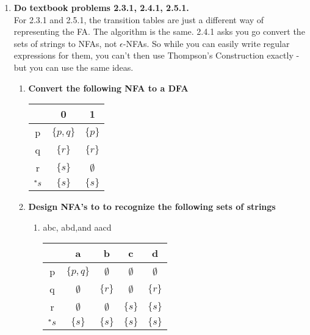 \begin{enumerate}
\newpage
\item \textbf{Do textbook problems 2.3.1, 2.4.1, 2.5.1.}
\\ For 2.3.1 and 2.5.1, the transition tables are just a different way of representing the FA. The algorithm is the same.
2.4.1 asks you go convert the sets of strings to NFAs, not $\epsilon$-NFAs. So while you can easily write regular expressions for them, you can't then use Thompson's Construction exactly -  but you can use the same ideas.
\begin{enumerate}
	\item \textbf{Convert the following NFA to a DFA}
	\begin{table}[H]
						\centering
		\begin{tabular}{c||c|c}
			 &  0 &  1   \\ \hline
			p& $\{p,q\}$ &  $\{p\}$   \\ \hline
			q&  $\{r\}$& $\{r\}$   \\ \hline
			r&  $\{s\}$& $\emptyset$   \\ \hline
			${}^\ast s$& $\{s\}$ & $\{s\}$ \\ \hline
		\end{tabular}
	\end{table}

\begin{figure}[h]
	\centering
\end{figure}

	\item \textbf{Design NFA's to to recognize the following sets of strings}
		\begin{enumerate}
			\item abc, abd,and aacd 
				\begin{table}[H]
				\centering
				\begin{tabular}{c||c|c|c|c}
					&  a &  b & c & d \\ \hline
					p& $\{p,q\}$ &  $\emptyset$ & $\emptyset$ & $\emptyset$   \\ \hline
					q&  $\emptyset$ & $\{r\}$& $\emptyset$ &  $\{r\}$   \\ \hline
					r&  $\emptyset$&  $\emptyset$ & $\{s\}$& $\{s\}$  \\ \hline
					${}^\ast s$& $\{s\}$ & $\{s\}$ & $\{s\}$ & $\{s\}$ \\ \hline
				\end{tabular}
			\end{table}
		

\end{enumerate}
\end{enumerate}
\end{enumerate}

